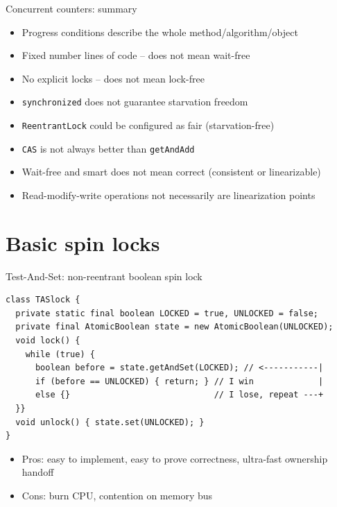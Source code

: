 \begin{frame}[t,fragile]{Concurrent counters: summary}

\begin{itemize}  
  \item Progress conditions describe the whole method/algorithm/object
  \pause
  \item Fixed number lines of code -- does not mean wait-free
  \pause
  \item No explicit locks -- does not mean lock-free
  \pause
  \item \texttt{synchronized} does not guarantee starvation freedom
  \pause
  \item \texttt{ReentrantLock} could be configured as fair (starvation-free)
  \pause
  \item \texttt{CAS} is not always better than \texttt{getAndAdd}
  \pause
  \item Wait-free and smart does not mean correct (consistent or linearizable)
  \pause
  \item Read-modify-write operations not necessarily are linearization points
\end{itemize}

\end{frame}

\section{Basic spin locks}
\showTOC

\begin{frame}[fragile]{Test-And-Set: non-reentrant boolean spin lock}

\begin{verbatim}
class TASlock {
  private static final boolean LOCKED = true, UNLOCKED = false;
  private final AtomicBoolean state = new AtomicBoolean(UNLOCKED);
  void lock() {
    while (true) {
      boolean before = state.getAndSet(LOCKED); // <-----------|
      if (before == UNLOCKED) { return; } // I win             |
      else {}                             // I lose, repeat ---+      
  }}
  void unlock() { state.set(UNLOCKED); }
}
\end{verbatim}

\pause
\begin{itemize}
  \item Pros: easy to implement, easy to prove correctness, ultra-fast ownership handoff
  \item Cons: burn CPU, contention on memory bus
\end{itemize}
\end{frame}


